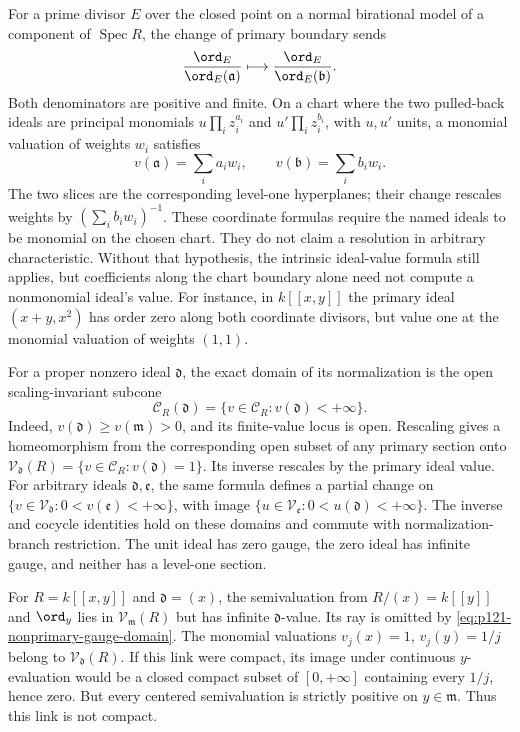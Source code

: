 For a prime divisor $E$ over the closed point on a normal birational
model of a component of $\operatorname{Spec}R$, the change of primary boundary sends
\[
             \frac{\ord_E}{\ord_E(\mathfrak a)}
                    \longmapsto
             \frac{\ord_E}{\ord_E(\mathfrak b)}.
\]
Both denominators are positive and finite. On a chart where the two
pulled-back ideals are principal monomials
$u\prod_i z_i^{a_i}$ and $u'\prod_i z_i^{b_i}$, with $u,u'$ units,
a monomial valuation of weights $w_i$ satisfies
\[
                  v(\mathfrak a)=\sum_i a_iw_i,
                  \qquad v(\mathfrak b)=\sum_i b_iw_i.
\tag{70.7d}\label{eq:p121-monomial-gauge-slices}
\]
The two slices are the corresponding level-one hyperplanes; their change
rescales weights by $(\sum_i b_iw_i)^{-1}$. These coordinate formulas
require the named ideals to be monomial on the chosen chart. They do not
claim a resolution in arbitrary characteristic. Without that hypothesis,
the intrinsic ideal-value formula still applies, but coefficients along
the chart boundary alone need not compute a nonmonomial ideal's value.
For instance, in $k[[x,y]]$ the primary ideal $(x+y,x^2)$ has order
zero along both coordinate divisors, but value one at the monomial
valuation of weights $(1,1)$.

For a proper nonzero ideal $\mathfrak d$, the exact domain of its
normalization is the open scaling-invariant subcone
\[
 \mathcal C_R(\mathfrak d)
       =\{v\in\mathcal C_R:v(\mathfrak d)<+\infty\}.
\tag{70.7e}\label{eq:p121-nonprimary-gauge-domain}
\]
Indeed, $v(\mathfrak d)\geq v(\mathfrak m)>0$, and its finite-value
locus is open. Rescaling gives a homeomorphism from the corresponding
open subset of any primary section onto
$\mathcal V_{\mathfrak d}(R)=\{v\in\mathcal C_R:v(\mathfrak d)=1\}$.
Its inverse rescales by the primary ideal value. For arbitrary ideals
$\mathfrak d,\mathfrak e$, the same formula defines a partial change
on $\{v\in\mathcal V_{\mathfrak d}:0<v(\mathfrak e)<+\infty\}$,
with image $\{u\in\mathcal V_{\mathfrak e}:0<u(\mathfrak d)<+\infty\}$.
The inverse and cocycle identities hold on these domains and commute
with normalization-branch restriction. The unit ideal has zero gauge,
the zero ideal has infinite gauge, and neither has a level-one section.

\begin{example}\label{ex:p121-nonprimary-noncompact-link}
For $R=k[[x,y]]$ and $\mathfrak d=(x)$, the semivaluation from
$R/(x)=k[[y]]$ and $\ord_y$ lies in $\mathcal V_{\mathfrak m}(R)$
but has infinite $\mathfrak d$-value. Its ray is omitted by
\eqref{eq:p121-nonprimary-gauge-domain}. The monomial valuations
$v_j(x)=1$, $v_j(y)=1/j$ belong to $\mathcal V_{\mathfrak d}(R)$.
If this link were compact, its image under continuous $y$-evaluation
would be a closed compact subset of $[0,+\infty]$ containing every
$1/j$, hence zero. But every centered semivaluation is strictly positive
on $y\in\mathfrak m$. Thus this link is not compact.
\end{example}

